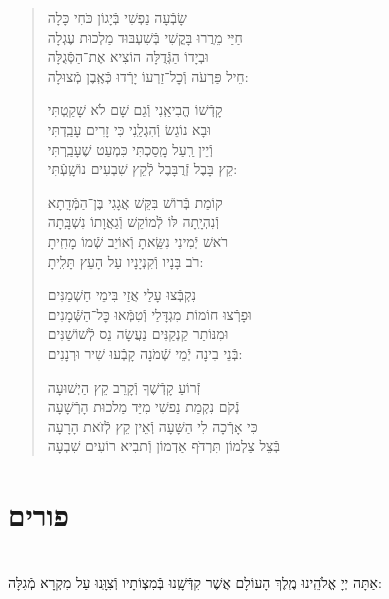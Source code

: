 \documentclass[twoside, openany, parskip=half, 11pt]{book}
\begin{document}
\begin{sometimes}
\begin{quote}
שָׂבְֿעָה נַפְשִׁי \hfill בְּֿיָגוֹן כֹּחִי כָּלָה \\ חַיַּי מֵרֲרוּ בָּקֳשִׁי \hfill בְּֿשִׁעְבּוּד מַלְכוּת עֶגְלָה \\
וּבְיָדוֹ הַגְּֿדֻלָּה \hfill הוֹצִיא אֶת־הַסְּֿגֻלָּה \\ חֵיל פַּרְעֹה וְֿכׇל־זַרְעוֹ \hfill יָרְֿדוּ כְּֿאֶֽבֶן מְֿצוּלָה:

קָדְֿשׁוֹ הֱבִיאַֽנִי \hfill וְֿגַם שָׁם לֹא שָׁקַֽטְתִּי \\ וּבָא נוֹגֵשׂ וְֿהִגְלַֽנִי \hfill כִּי זָרִים עָבַֽדְתִּי \\
וְֿיֵין רַֽעַל מָֽסַכְתִּי \hfill כִּמְעַט שֶׁעָבַֽרְתִּי \\ קֵץ בָּבֶל זְֿרֻבָּבֶל \hfill לְֿקֵץ שִׁבְעִים נוֹשָֽׁעְֿתִּי:

קוֹמַת בְּֿרוֹשׁ בִּקֵּשׁ \hfill אֲגָגִי בֶּן־הַמְּֿדָֽתָא \\ וְֿנִהְיָֽתָה לּוֹ לְֿמוֹקֵשׁ \hfill וְֿגַאֲוָתוֹ נִשְׁבָּֽתָה \\
רֹאשׁ יְֿמִינִי נִשֵּֽׂאתָ \hfill וְֿאוֹיֵב שְֿׁמוֹ מָחִֽיתָ \\ רֹב בָּנָיו וְֿקִנְיָנָיו \hfill עַל הָעֵץ תָּלִֽיתָ:

נִקְבְּֿצוּ עָלַי \hfill אֲזַי בִּימֵי חַשְׁמַנִּים \\ וּפָרְֿצוּ חוֹמוֹת מִגְדָּלַי \hfill וְֿטִמְּֿאוּ כׇּל־הַשְּֿׁמָנִים \\
וּמִנּוֹתַר קַנְקַנִּים \hfill נַעֲשָׂה נֵס לְֿשׁוֹשַׁנִּים \\ בְּֿנֵי בִינָה יְֿמֵי שְֿׁמֹנָה \hfill קָבְֿעוּ שִׁיר וּרְנָנִים:


זְֿרוֹעַ קָדְֿשֶׁךָ \hfill וְֿקָרֵב קֵץ הַיְשׁוּעָה\\
נְֿקֹם נִקְמַת נַפשִׁי \hfill מִיַּד מַלכוּת הָרְֿשָׁעָה\\
כִּי אָרְֿכָה לִי הַשָּׁעָה \hfill וְֿאֵין קֵץ לְֿזׂאת הָרָעָה\\
בְּֿצֵל צַלְמוֹן תִּרְדּׂף אַדְמוֹן \hfill וְֿתבִיא רוֹעִים שִׁבְעָה

\end{quote}

\vfill
\sepline

\chapter[פורים]{ פורים }

\label{purim}

\\
אַתָּה יְיָ אֱלֹהֵֽינוּ מֶֽלֶךְ הָעוֹלָם
אֲשֶׁר קִדְּֿשָֽׁנוּ בְּֿמִצְוֹתָיו וְֿצִוָּֽנוּ עַל מִקְרָא מְֿגִלָּה:



\end{sometimes}
\end{document}
